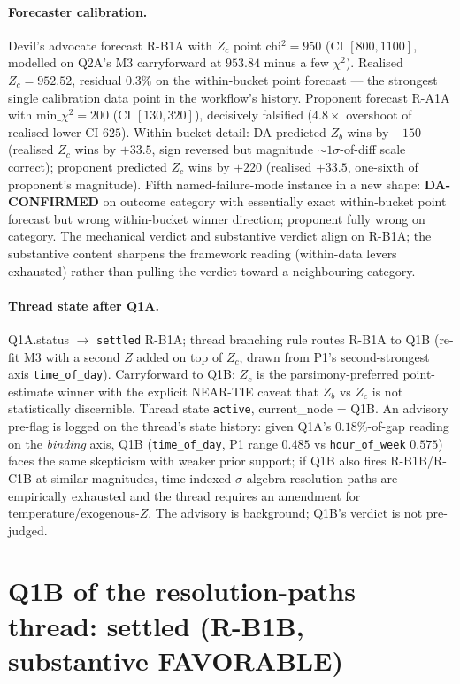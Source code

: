 \documentclass[11pt]{article}
\theoremstyle{definition}
\theoremstyle{plain}
\begin{document}
\paragraph{Forecaster calibration.}
Devil's advocate forecast R-B1A with $Z_c$ point chi$^2 = 950$
(CI $[800, 1100]$, modelled on Q2A's M3 carryforward at $953.84$
minus a few $\chi^2$). Realised $Z_c = 952.52$, residual
$\mathbf{0.3\%}$ on the within-bucket point forecast --- the
strongest single calibration data point in the workflow's history.
Proponent forecast R-A1A with $\mathrm{min}\_\chi^2 = 200$ (CI
$[130, 320]$), decisively falsified ($4.8\times$ overshoot of
realised lower CI $625$). Within-bucket detail: DA predicted $Z_b$
wins by $-150$ (realised $Z_c$ wins by $+33.5$, sign reversed but
magnitude $\sim 1\sigma$-of-diff scale correct); proponent
predicted $Z_c$ wins by $+220$ (realised $+33.5$, one-sixth of
proponent's magnitude). Fifth named-failure-mode instance in a
new shape: \textbf{DA-CONFIRMED} on outcome category with
essentially exact within-bucket point forecast but wrong
within-bucket winner direction; proponent fully wrong on category.
The mechanical verdict and substantive verdict align on R-B1A;
the substantive content sharpens the framework reading (within-data
levers exhausted) rather than pulling the verdict toward a
neighbouring category.

\paragraph{Thread state after Q1A.}
Q1A.status $\to$ \texttt{settled} R-B1A; thread branching rule
routes R-B1A to Q1B (re-fit M3 with a second $Z$ added on top of
$Z_c$, drawn from P1's second-strongest axis \texttt{time\_of\_day}).
Carryforward to Q1B: $Z_c$ is the parsimony-preferred point-estimate
winner with the explicit NEAR-TIE caveat that $Z_b$ vs $Z_c$ is
not statistically discernible. Thread state \texttt{active},
current\_node = Q1B. An advisory pre-flag is logged on the thread's
state history: given Q1A's $0.18\%$-of-gap reading on the
\emph{binding} axis, Q1B (\texttt{time\_of\_day}, P1 range $0.485$
vs \texttt{hour\_of\_week} $0.575$) faces the same skepticism with
weaker prior support; if Q1B also fires R-B1B/R-C1B at similar
magnitudes, time-indexed $\sigma$-algebra resolution paths are
empirically exhausted and the thread requires an amendment for
temperature/exogenous-$Z$. The advisory is background; Q1B's
verdict is not pre-judged.

\section{Q1B of the resolution-paths thread: settled (R-B1B, substantive FAVORABLE)}
\label{sec:q1b-settled}
\end{document}
